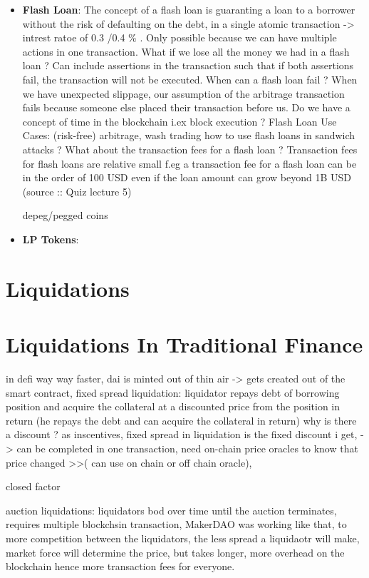 \documentclass{article}
\begin{document}
\begin{itemize}
\item \textbf{Flash Loan}: The concept of a flash loan is guaranting a loan to a borrower without the risk of defaulting on the debt, in a single atomic transaction -> intrest ratoe of 0.3 /0.4 \% . Only possible because we can have multiple actions in one transaction. 
What if we lose all the money we had in a flash loan ?  Can include assertions in the transaction such that if both assertions fail, the transaction will not be executed.
When can a flash loan fail ?
When we have unexpected slippage, our assumption of the arbitrage transaction fails because someone else placed their transaction before us.
Do we have a concept of time in the blockchain i.ex block execution ?
Flash Loan Use Cases: 
    (risk-free) arbitrage, wash trading
how to use flash loans in sandwich attacks ?
What about the transaction fees for a flash loan ? Transaction fees for flash loans are relative small f.eg a transaction fee for a flash loan can be in the order of 100 USD even if the loan amount can grow beyond 1B USD (source :: Quiz lecture 5)

depeg/pegged coins

\item \textbf{LP Tokens}:



\end{itemize}

\section{Liquidations}

\section{Liquidations In Traditional Finance}
in defi way way faster, dai is minted out of thin air -> gets created out of the smart contract, 
fixed spread liquidation: liquidator repays debt of borrowing position and acquire the collateral at a discounted price from the position in return (he repays the debt and can acquire the collateral in return)
why is there a discount ? as inscentives, fixed spread in liquidation is the fixed discount i get, -> can be completed in one transaction, need on-chain price oracles to know that price changed >>( can use on chain or off chain oracle),

closed factor 

auction liquidations: liquidators bod over time until the auction terminates, requires multiple blockchsin transaction,
MakerDAO was working like that, to more competition between the liquidators, the less spread a liquidaotr will make, market force will determine the price, but takes longer, more overhead on the blockchain hence more transaction fees for everyone.
\end{document}
